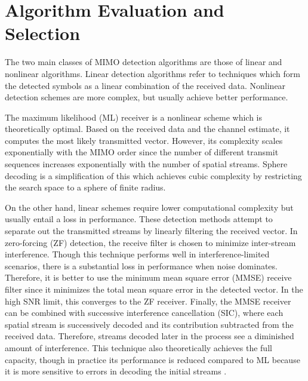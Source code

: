 \documentclass[journal]{IEEEtran}
\begin{document}
\section{Algorithm Evaluation and Selection}
\label{matlab_comparison_section}

The two main classes of MIMO detection algorithms are those of linear and nonlinear algorithms. Linear detection algorithms refer to techniques which form the detected symbols as a linear combination of the received data. Nonlinear detection schemes are more complex, but usually achieve better performance. 

The maximum likelihood (ML) receiver is a nonlinear scheme which is theoretically optimal. Based on the received data and the channel estimate, it computes  the most likely transmitted vector. However, its complexity scales exponentially with the MIMO order since the number of different transmit sequences increases exponentially with the number of spatial streams. Sphere decoding is a simplification of this which achieves cubic complexity by restricting the search space to a sphere of finite radius. 

On the other hand, linear schemes require lower computational complexity but usually entail a loss in performance. These detection methods attempt to separate out the transmitted streams by linearly filtering the received vector. In zero-forcing (ZF) detection, the receive filter is chosen to minimize inter-stream interference. Though this technique performs well in interference-limited scenarios, there is a substantial loss in performance when noise dominates. Therefore, it is better to use the minimum mean square error (MMSE) receive filter since it minimizes the total mean square error in the detected vector. In the high SNR limit, this converges to the ZF receiver. Finally, the MMSE receiver can be combined with successive interference cancellation (SIC), where each spatial stream is successively decoded and its contribution subtracted from the received data. Therefore, streams decoded later in the process see a diminished amount of interference. This technique also theoretically achieves the full capacity, though in practice its performance is reduced compared to ML because it is more sensitive to errors in decoding the initial streams \cite{tse}. 
\end{document}
